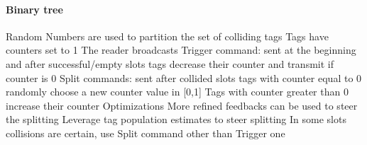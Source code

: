 \paragraph*{Binary tree}
Random Numbers are used to partition the set of colliding tags
Tags have counters set to 1
The reader broadcasts
Trigger command: sent at the beginning and after successful/empty slots
tags decrease their counter and transmit if counter is 0
Split commands: sent after collided slots
tags with counter equal to 0 randomly choose a new counter value in [0,1]
Tags with counter greater than 0 increase their counter
Optimizations
More refined feedbacks can be used to steer the splitting
Leverage tag population estimates to steer splitting
In some slots collisions are certain, use Split command other than Trigger
one